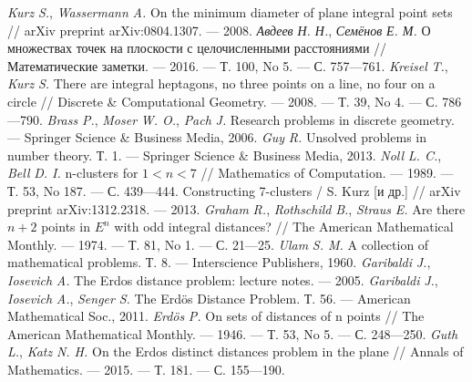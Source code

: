 \begin{thebibliography}{99}
\emph{Kurz} \emph{S.}, \emph{Wassermann} \emph{A.} On
the minimum diameter of plane integral point sets // arXiv
preprint arXiv:0804.1307. — 2008.
\emph{Авдеев} \emph{Н. Н.}, \emph{Семёнов} \emph{Е. М.}
О множествах точек на плоскости с целочисленными
расстояниями // Математические заметки. — 2016. — Т. 100,
No 5. — С. 757—761.
\emph{Kreisel} \emph{T.}, \emph{Kurz} \emph{S.} There are
integral heptagons, no three points on a line, no four on a circle //
Discrete \& Computational Geometry. — 2008. — Т. 39, No 4. —
С. 786—790.
\emph{Brass} \emph{P.}, \emph{Moser} \emph{W. O.},
\emph{Pach} \emph{J.} Research problems in discrete
geometry. — Springer Science \& Business Media, 2006.
\emph{Guy} \emph{R.} Unsolved problems in number theory. Т.
1. — Springer Science \& Business Media, 2013.
\emph{Noll} \emph{L. C.}, \emph{Bell} \emph{D. I.} n-clusters
for $1 < n < 7$ // Mathematics of Computation. — 1989. — Т. 53,
No 187. — С. 439—444.
Constructing 7-clusters / S. Kurz [и др.] // arXiv preprint
arXiv:1312.2318. — 2013.
\emph{Graham} \emph{R.}, \emph{Rothschild} \emph{B.},
\emph{Straus} \emph{E.} Are there $n + 2$ points in $E^n$ with odd
integral distances? // The American Mathematical Monthly. —
1974. — Т. 81, No 1. — С. 21—25.
\emph{Ulam} \emph{S. M.} A collection of mathematical
problems. Т. 8. — Interscience Publishers, 1960.
\emph{Garibaldi} \emph{J.}, \emph{Iosevich} \emph{A.} The
Erdos distance problem: lecture notes. — 2005.
\emph{Garibaldi} \emph{J.}, \emph{Iosevich} \emph{A.},
\emph{Senger} \emph{S.} The Erdös Distance Problem. Т. 56. —
American Mathematical Soc., 2011.
\emph{Erdös} \emph{P.} On sets of distances of n points //
The American Mathematical Monthly. — 1946. — Т. 53, No 5. —
С. 248—250.
\emph{Guth} \emph{L.}, \emph{Katz} \emph{N. H.} On the
Erdos distinct distances problem in the plane // Annals of
Mathematics. — 2015. — Т. 181. — С. 155—190.
\end{thebibliography}
